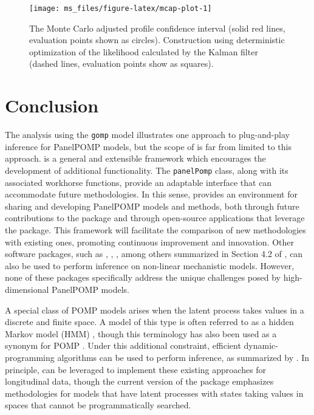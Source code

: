 \begin{figure}

{\centering \texttt{[image: ms\_files/figure-latex/mcap-plot-1]} 

}

\caption{The Monte Carlo adjusted profile confidence interval (solid red lines, evaluation points shown as circles). Construction using deterministic optimization of the likelihood calculated by the Kalman filter (dashed lines, evaluation points show as squares).}\label{fig:mcap-plot}
\end{figure}

\section{Conclusion}\label{conclusion}

The analysis using the \texttt{gomp} model illustrates one approach to plug-and-play inference for PanelPOMP models, but the scope of  is far from limited to this approach.
 is a general and extensible framework which encourages the development of additional functionality.
The \texttt{panelPomp} class, along with its associated workhorse functions, provide an adaptable interface that can accommodate future methodologies.
In this sense,  provides an environment for sharing and developing PanelPOMP models and methods, both through future contributions to the  package and through open-source applications that leverage the package.
This framework will facilitate the comparison of new methodologies with existing ones, promoting continuous improvement and innovation.
Other software packages, such as , , , among others summarized in Section 4.2 of \citet{newman23}, can also be used to perform inference on non-linear mechanistic models.
However, none of these packages specifically address the unique challenges posed by high-dimensional PanelPOMP models.

A special class of POMP models arises when the latent process takes values in a discrete and finite space.
A model of this type is often referred to as a hidden Markov model (HMM) \citep{eddy04, doucet01, glennie23, newman23}, though this terminology has also been used as a synonym for POMP \citep{king16}.
Under this additional constraint, efficient dynamic-programming algorithms can be used to perform inference, as summarized by \citet{mcclintock20}.
In principle,  can be leveraged to implement these existing approaches for longitudinal data, though the current version of the package emphasizes methodologies for models that have latent processes with states taking values in spaces that cannot be programmatically searched.

